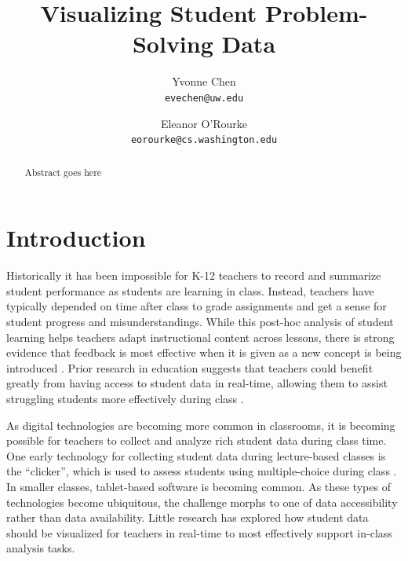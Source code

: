 \documentclass{sigchi}
\begin{document}
\author{
  Yvonne Chen\\
  \texttt{evechen@uw.edu}
  \and
  Eleanor O'Rourke\\
  \texttt{eorourke@cs.washington.edu}
}
\title{Visualizing Student Problem-Solving Data}


\maketitle

\begin{abstract}
Abstract goes here
\end{abstract}




\section{Introduction}

Historically it has been impossible for K-12 teachers to record and summarize student performance as students are learning in class. Instead, teachers have typically depended on time after class to grade assignments and get a sense for student progress and misunderstandings. While this post-hoc analysis of student learning helps teachers adapt instructional content across lessons, there is strong evidence that feedback is most effective when it is given as a new concept is being introduced \cite{Gibbs04, Steadman98}. Prior research in education suggests that teachers could benefit greatly from having access to student data in real-time, allowing them to assist struggling students more effectively during class \cite{Balaam2010, Koile2006, Lazar2007}.

As digital technologies are becoming more common in classrooms, it is becoming possible for teachers to collect and analyze rich student data during class time. One early technology for collecting student data during lecture-based classes is the ``clicker'', which is used to assess students using multiple-choice during class \cite{Dangel08, Lazar2007}. In smaller classes, tablet-based software is becoming common. As these types of technologies become ubiquitous, the challenge morphs to one of data accessibility rather than data availability. Little research has explored how student data should be visualized for teachers in real-time to most effectively support in-class analysis tasks.
\end{document}
